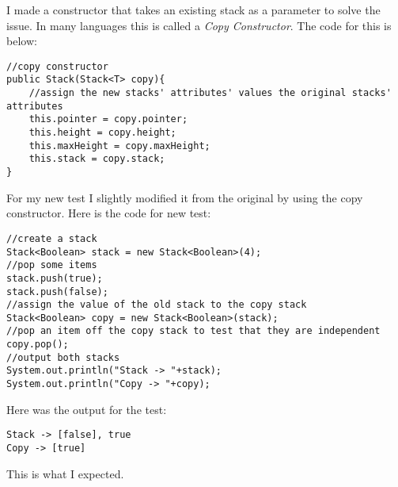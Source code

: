 \documentclass[../../../../main.tex]{subfiles}
\begin{document}
\newpage
\noindent
I made a constructor that takes an existing stack as a parameter to solve the issue. In many languages this is called a \textit{Copy Constructor}. The code for this is below:
\begin{verbatim}
//copy constructor
public Stack(Stack<T> copy){
	//assign the new stacks' attributes' values the original stacks' attributes
	this.pointer = copy.pointer;
	this.height = copy.height;
	this.maxHeight = copy.maxHeight;
	this.stack = copy.stack;
}
\end{verbatim}
For my new test I slightly modified it from the original by using the copy constructor. Here is the code for new test:
\begin{verbatim}
//create a stack
Stack<Boolean> stack = new Stack<Boolean>(4);
//pop some items
stack.push(true);
stack.push(false);
//assign the value of the old stack to the copy stack 
Stack<Boolean> copy = new Stack<Boolean>(stack);
//pop an item off the copy stack to test that they are independent
copy.pop();
//output both stacks
System.out.println("Stack -> "+stack);
System.out.println("Copy -> "+copy);
\end{verbatim}
Here was the output for the test:
\begin{verbatim}
Stack -> [false], true
Copy -> [true]
\end{verbatim}
This is what I expected.
\newpage
\end{document}
